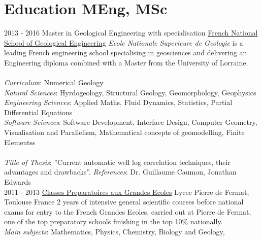 \documentclass[]{friggeri-cv}
\begin{document}
\section{Education MEng, MSc}
\begin{entrylist}
  \entry
    {2013 - 2016}
    {Master in Geological Engineering with specialisation}
    {\href{http://ensg.univ-lorraine.fr/english/}{French National School of Geological Engineering}}
    {\emph{Ecole Nationale Superieure de Geologie} is a leading French engineering school specialising in geosciences and delivering an Engineering diploma combined with a Master from the University of Lorraine.\\ 
    \\
    \emph{Curriculum}: Numerical Geology\\ 
    \emph{Natural Sciences}: Hyrdogeology, Structural Geology, Geomorphology, Geophysics\\
    \emph{Engineering Sciences}: Applied Maths, Fluid Dynamics, Statistics, Partial Differential Equations\\
    \emph{Software Sciences}:  Software Development, Interface Design, Computer Geometry, Visualisation and Parallelism, Mathematical concepts of geomodelling, Finite Elementss\\
    \\
    \emph{Title of Thesis}: ”Current automatic well log correlation techniques, their advantages and drawbacks”.
    \emph{References}: Dr. Guillaume Caumon, Jonathan Edwards\\}
  \entry
    {2011 - 2013}
    {\href{https://en.wikipedia.org/wiki/Classe_preparatoire_aux_grandes_ecoles}{Classes Preparatoires aux Grandes Ecoles}}
    {Lycee Pierre de Fermat, Toulouse France}
    {2 years of intensive general scientific courses before national exams for entry to the French Grandes Ecoles, carried out at Pierre de Fermat, one of the top preparatory schools finishing in the top 10\% nationally.\\ 
    \emph{Main subjects}: Mathematics, Physics, Chemistry, Biology and Geology, \\}
\end{entrylist}
\vspace*{\fill}
\end{document}
